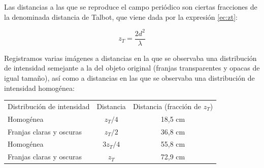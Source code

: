 \documentclass{./packages/optica-article}
\begin{document}
Las distancias a las que se reproduce el campo periódico son ciertas fracciones de la denominada distancia de Talbot, que viene dada por la expresión \ref{ec:zt}:

\begin{center}
    \begin{equation}
        z_T = \frac{2d^2}{\lambda}
        \label{ec:zt}
    \end{equation}
\end{center}


Registramos varias imágenes a distancias en la que se observaba una distribución de intensidad semejante a la del objeto original (franjas transparentes y opacas de igual tamaño), así como a distancias en las que se observaba una distribución de intensidad homogénea:\par

\begin{center}
    \begin{tabular}{|l|c|c|} \hline
         Distribución de intensidad & Distancia & Distancia (fracción de $z_T$)\\ 
         Homogénea & $z_T/4$ & 18,5 cm \\ 
        Franjas claras y oscuras &  $z_T/2$ &36,8 cm \\ 
        Homogénea  & $3z_T/4$& 55,8 cm\\ 
        Franjas claras y oscuras &  $z_T$ &72,9 cm \\ 
    \end{tabular}
    \label{tab:talbot}
\end{center}
\end{document}
